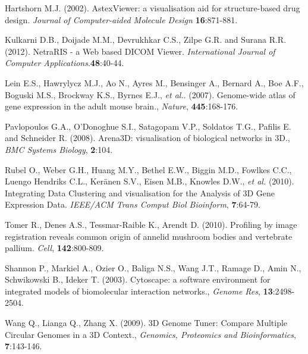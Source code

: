 \documentclass{bioinfo}
\begin{document}
\begin{thebibliography}{}

 Hartshorn M.J. (2002). AstexViewer: a visualisation aid for structure-based drug design. {\it{Journal of Computer-aided Molecule Design}} {\bf{16}}:871-881.

 Kulkarni D.B., Doijade M.M., Devrukhkar C.S., Zilpe G.R. and Surana R.R. (2012). NetraRIS - a Web based DICOM Viewer. {\it{International Journal of Computer Applications}}.{\bf{48}}:40-44.

 Lein E.S., Hawrylycz M.J., Ao N., Ayres M., Bensinger A., Bernard A., Boe A.F., Boguski M.S., Brockway K.S., Byrnes E.J., {\it{et al.}}. (2007). Genome-wide atlas of gene expression in the adult mouse brain., {\it Nature}, {\bf{445}}:168-176.

 Pavlopoulos G.A., O'Donoghue S.I., Satagopam V.P., Soldatos T.G., Pafilis E. and Schneider R. (2008). Arena3D: visualisation of biological networks in 3D., {\it BMC Systems Biology}, {\bf{2}}:104.

 Rubel O., Weber G.H., Huang M.Y., Bethel E.W., Biggin M.D., Fowlkes C.C., Luengo Hendriks C.L., Ker\"{a}nen S.V., Eisen M.B., Knowles D.W., {\it{et al.}} (2010). Integrating Data Clustering and visualisation for the Analysis of 3D Gene Expression Data. {\it IEEE/ACM Trans Comput Biol Bioinform}, {\bf{7}}:64-79.

 Tomer R., Denes A.S., Tessmar-Raible K., Arendt D. (2010). Profiling by image registration reveals common origin of annelid mushroom bodies and vertebrate pallium. {\it{Cell}}, {\bf{142}}:800-809. 

 Shannon P., Markiel A., Ozier O., Baliga N.S., Wang J.T., Ramage D., Amin N., Schwikowski B., Ideker T. (2003). Cytoscape: a software environment for integrated models of biomolecular interaction networks., {\it Genome Res}, {\bf{13}}:2498-2504.

 Wang Q., Lianga Q., Zhang X. (2009). 3D Genome Tuner: Compare Multiple Circular Genomes in a 3D Context., {\it Genomics, Proteomics and Bioinformatics}, {\bf{7}}:143-146.



\end{thebibliography}
\end{document}
